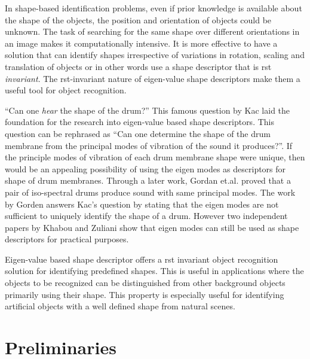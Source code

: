 In shape-based identification problems, even if prior knowledge is available about the shape of the objects, the position and orientation of objects could be unknown. The task of searching for the same shape over different orientations in an image makes it computationally intensive. It is more effective to have a solution that can identify shapes irrespective of variations in rotation, scaling and translation of objects or in other words use a shape descriptor that is \gls{rst} \textit{invariant}. The \gls{rst}-invariant nature of eigen-value shape descriptors make them a useful tool for object recognition. 

``Can one \emph{hear} the shape of the drum?'' This famous question by Kac \cite{kac} laid the foundation for the research into eigen-value based shape descriptors.
This question can be rephrased as ``Can one determine the shape of the drum membrane from the principal modes of vibration of the sound it produces?''.
If the principle modes of vibration of each drum membrane shape were unique, then would be an appealing possibility of using the eigen modes as descriptors for shape of drum membranes. 
Through a later work, Gordan et.al.\cite{gordon} proved that a pair of iso-spectral drums produce sound with same principal modes. The work by Gorden answers Kac's question by stating that the eigen modes are not sufficient to uniquely identify the shape of a drum. However two independent papers by Khabou and Zuliani \cite{khabou,zuliani} show that eigen modes can still be used as shape descriptors for practical purposes.

Eigen-value based shape descriptor offers a \gls{rst} invariant object recognition solution for identifying predefined shapes. This is useful in applications where the objects to be recognized can be distinguished from other background objects primarily using their shape. This property is especially useful for identifying artificial objects with a well defined shape from natural scenes.


\section{Preliminaries}


